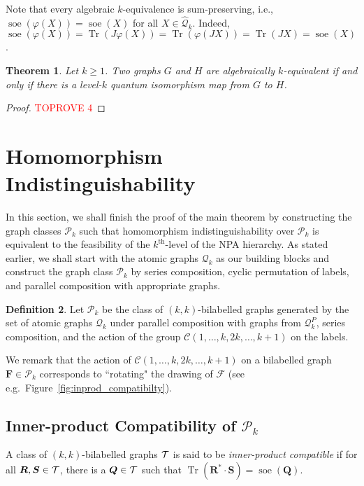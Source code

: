 \documentclass[11pt,a4paper]{article}
\theoremstyle{plain}
\newtheorem{thm}{Theorem}[section]
\theoremstyle{remark}
\theoremstyle{definition}
\newtheorem{definition}[thm]{Definition}
\DeclareMathOperator{\tr}{Tr}
\DeclareMathOperator{\soe}{soe}
\def\calP{{\mathcal P}} \def\calQ{{\mathcal Q}} \def\calR{{\mathcal R}}
\newcommand{\cyclicpermutations}{\mathscr{C}(1,\dots, k, 2k, \dots, k+1)}
\begin{document}
Note that every algebraic $k$-equivalence is sum-preserving, i.e., $\soe(\varphi(X)) = \soe(X)$ for all $X \in \hat{\calQ}_k$. Indeed, $\soe(\varphi(X)) = \tr(J\varphi(X)) = \tr(\varphi(JX)) = \tr(JX) = \soe(X)$. 

\begin{thm}\label{thm:main-theorem-2}
  Let $k\geq 1$. 
  Two graphs $G$ and $H$ are algebraically $k$-equivalent if and only if there is a level-$k$ quantum isomorphism map from $G$ to $H$.
\end{thm}
\begin{proof}\textcolor{red}{TOPROVE 4}\end{proof}

\section{Homomorphism Indistinguishability}\label{sec:hom-ind}

In this section, we shall finish the proof of the main theorem by constructing the graph classes $\calP_k$ such that homomorphism indistinguishability over $\mathcal{P}_k$ is equivalent to the feasibility of the $k^{\text{th}}$-level of the NPA hierarchy. As stated earlier, we shall start with the atomic graphs $\calQ_k$ as our building blocks and construct the graph class $\calP_k$ by series composition, cyclic permutation of labels, and parallel composition with appropriate graphs. 

\begin{definition}\label{def:pk}
  Let $\mathcal{P}_k$ be the class of $(k, k)$-bilabelled graphs generated by the set of atomic graphs $\mathcal{Q}_k$ under parallel composition with graphs from $\mathcal{Q}_k^P$, series composition, and the action of the group $\cyclicpermutations$ on the labels.
\end{definition}

We remark that the action of $\cyclicpermutations$ on a bilabelled graph $\boldsymbol{F} \in \calP_k$ corresponds to ``rotating" the drawing of $\mathcal{F}$ (see e.g.~Figure~\ref{fig:inprod_compatibilty}). 


\subsection{Inner-product Compatibility of $\calP_k$}\label{sub-sec:inprodcomp}

A class of $(k,k)$-bilabelled graphs ${\mathcal T}$ is said to be \emph{inner-product compatible} if for all $\boldsymbol{R}, \boldsymbol{S} \in {\mathcal T}$, there is a $\boldsymbol{Q} \in {\mathcal T}$ such that $\tr(\boldsymbol{R}^*\cdot \boldsymbol{S}) = \soe(\boldsymbol{Q})$. 
\end{document}
